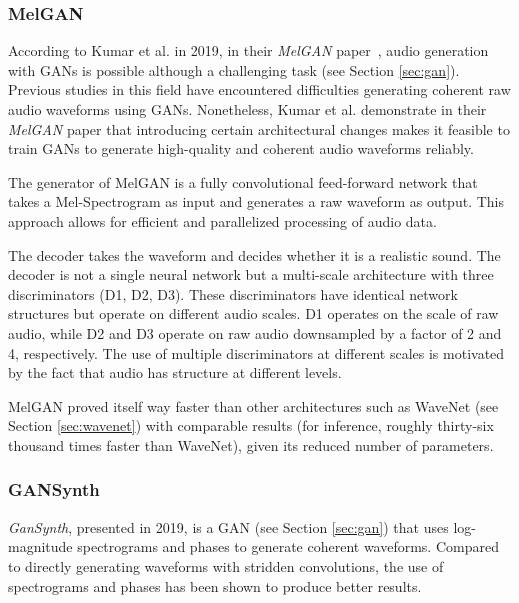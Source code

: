 \subsubsection{MelGAN} \label{sec:melgan}

According to Kumar et al. in 2019, in their \textit{MelGAN} paper~\cite{kumar_melgan_2019}, audio generation with \acp{GAN} is possible although a challenging task (see Section \ref{sec:gan}). Previous studies in this field have encountered difficulties generating coherent raw audio waveforms using \acp{GAN}. Nonetheless, Kumar et al. demonstrate in their \textit{MelGAN} paper that introducing certain architectural changes makes it feasible to train \acp{GAN} to generate high-quality and coherent audio waveforms reliably.

The generator of MelGAN is a fully convolutional feed-forward network that takes a Mel-Spectrogram as input and generates a raw waveform as output. This approach allows for efficient and parallelized processing of audio data.

The decoder takes the waveform and decides whether it is a realistic sound. The decoder is not a single neural network but a multi-scale architecture with three discriminators (D1, D2, D3). These discriminators have identical network structures but operate on different audio scales. D1 operates on the scale of raw audio, while D2 and D3 operate on raw audio downsampled by a factor of 2 and 4, respectively. The use of multiple discriminators at different scales is motivated by the fact that audio has structure at different levels.

MelGAN proved itself way faster than other architectures such as WaveNet (see Section \ref{sec:wavenet}) with comparable results (for inference, roughly thirty-six thousand times faster than WaveNet), given its reduced number of parameters.



\subsubsection{GANSynth} \label{sec:gansynth}

\textit{GanSynth}, presented in 2019, \cite{engel_gansynth_2019} is a \ac{GAN} (see Section \ref{sec:gan}) that uses log-magnitude spectrograms and phases to generate coherent waveforms. Compared to directly generating waveforms with stridden convolutions, the use of spectrograms and phases has been shown to produce better results.

